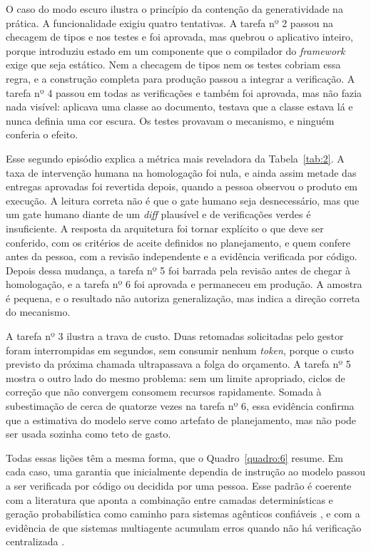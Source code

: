 O caso do modo escuro ilustra o princípio da contenção da generatividade na prática. A funcionalidade exigiu quatro tentativas. A tarefa nº 2 passou na checagem de tipos e nos testes e foi aprovada, mas quebrou o aplicativo inteiro, porque introduziu estado em um componente que o compilador do \textit{framework} exige que seja estático. Nem a checagem de tipos nem os testes cobriam essa regra, e a construção completa para produção passou a integrar a verificação. A tarefa nº 4 passou em todas as verificações e também foi aprovada, mas não fazia nada visível: aplicava uma classe ao documento, testava que a classe estava lá e nunca definia uma cor escura. Os testes provavam o mecanismo, e ninguém conferia o efeito.

Esse segundo episódio explica a métrica mais reveladora da Tabela~\ref{tab:2}. A taxa de intervenção humana na homologação foi nula, e ainda assim metade das entregas aprovadas foi revertida depois, quando a pessoa observou o produto em execução. A leitura correta não é que o gate humano seja desnecessário, mas que um gate humano diante de um \textit{diff} plausível e de verificações verdes é insuficiente. A resposta da arquitetura foi tornar explícito o que deve ser conferido, com os critérios de aceite definidos no planejamento, e quem confere antes da pessoa, com a revisão independente e a evidência verificada por código. Depois dessa mudança, a tarefa nº 5 foi barrada pela revisão antes de chegar à homologação, e a tarefa nº 6 foi aprovada e permaneceu em produção. A amostra é pequena, e o resultado não autoriza generalização, mas indica a direção correta do mecanismo.

A tarefa nº 3 ilustra a trava de custo. Duas retomadas solicitadas pelo gestor foram interrompidas em segundos, sem consumir nenhum \textit{token}, porque o custo previsto da próxima chamada ultrapassava a folga do orçamento. A tarefa nº 5 mostra o outro lado do mesmo problema: sem um limite apropriado, ciclos de correção que não convergem consomem recursos rapidamente. Somada à subestimação de cerca de quatorze vezes na tarefa nº 6, essa evidência confirma que a estimativa do modelo serve como artefato de planejamento, mas não pode ser usada sozinha como teto de gasto.

Todas essas lições têm a mesma forma, que o Quadro~\ref{quadro:6} resume. Em cada caso, uma garantia que inicialmente dependia de instrução ao modelo passou a ser verificada por código ou decidida por uma pessoa. Esse padrão é coerente com a literatura que aponta a combinação entre camadas determinísticas e geração probabilística como caminho para sistemas agênticos confiáveis \cite{abouali2025agentic}, e com a evidência de que sistemas multiagente acumulam erros quando não há verificação centralizada \cite{kim2026scaling}.

